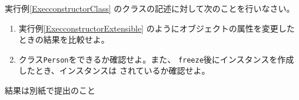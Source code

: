  \begin{Prob}\upshape\Must
  実行例\else\ref{ExecconstructorClass}\fi
  のクラスの記述に対して次のことを行いなさい。
  \begin{enumerate}
   \item 実行例\else\ref{ExecconstructorExtensible}\fi
         のようにオブジェクトの属性を変更したときの結果を比較せよ。
   \item クラス\texttt{Person}をできるか確認せよ。また、
         \texttt{freeze}後にインスタンスを作成したとき、インスタンスは
         されているか確認せよ。
  \end{enumerate}
 \end{Prob}
\ifText 結果は別紙で提出のこと\fi
